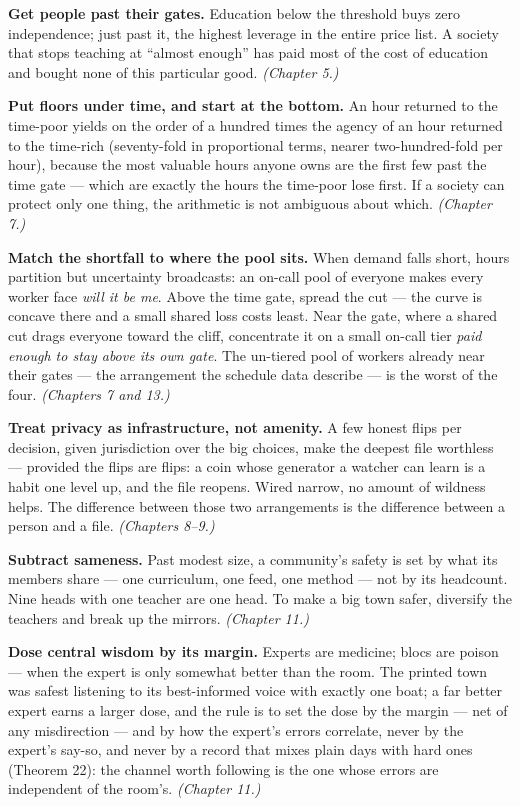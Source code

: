 
\textbf{Get people past their gates.} Education below the threshold buys
zero independence; just past it, the highest leverage in the entire
price list. A society that stops teaching at ``almost enough'' has paid
most of the cost of education and bought none of this particular
good. \emph{(Chapter 5.)}

\textbf{Put floors under time, and start at the bottom.} An hour returned
to the time-poor yields on the order of a hundred times the agency of
an hour returned to the time-rich (seventy-fold in proportional terms,
nearer two-hundred-fold per hour), because the most valuable hours anyone
owns are the first few past the time gate --- which are exactly the
hours the time-poor lose first. If a society can protect only one
thing, the arithmetic is not ambiguous about which. \emph{(Chapter 7.)}

\textbf{Match the shortfall to where the pool sits.} When demand falls
short, hours partition but uncertainty broadcasts: an on-call pool of
everyone makes every worker face \emph{will it be me}. Above the time gate,
spread the cut --- the curve is concave there and a small shared loss
costs least. Near the gate, where a shared cut drags everyone toward
the cliff, concentrate it on a small on-call tier \emph{paid enough to stay
above its own gate}. The un-tiered pool of workers already near their
gates --- the arrangement the schedule data describe --- is the worst of
the four. \emph{(Chapters 7 and 13.)}

\textbf{Treat privacy as infrastructure, not amenity.} A few honest flips
per decision, given jurisdiction over the big choices, make the
deepest file worthless --- provided the flips are flips: a coin whose
generator a watcher can learn is a habit one level up, and the file
reopens. Wired narrow, no amount of wildness helps.
The difference between those two arrangements is the difference
between a person and a file. \emph{(Chapters 8--9.)}

\textbf{Subtract sameness.} Past modest size, a community's safety is set
by what its members share --- one curriculum, one feed, one method ---
not by its headcount. Nine heads with one teacher are one head.
To make a big town safer, diversify the teachers and break up the
mirrors. \emph{(Chapter 11.)}

\textbf{Dose central wisdom by its margin.} Experts are medicine; blocs are
poison --- when the expert is only somewhat better than the room. The
printed town was safest listening to its best-informed voice with
exactly one boat; a far better expert earns a larger dose, and the
rule is to set the dose by the margin --- net of any misdirection --- and
by how the expert's errors correlate, never by the expert's say-so, and never by a record that mixes plain
days with hard ones (Theorem 22):
the channel worth following is the one whose errors are independent of
the room's. \emph{(Chapter 11.)}

